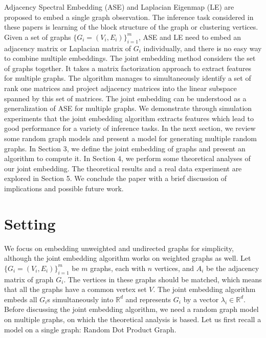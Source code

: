 \documentclass[10pt,journal,compsoc]{IEEEtran}
\begin{document}
\noindent Adjacency Spectral Embedding (ASE) and Laplacian Eigenmap (LE) are proposed to embed a single graph observation\cite{sussman2012consistent, belkin2003laplacian}. The inference task considered in these papers is learning of the block structure of the graph or clustering vertices. Given a set of graphs $\{G_i=(V_i,E_i)\} _{i=1}^{m}$, ASE and LE need to embed an adjacency matrix or Laplacian matrix of $G_i$ individually, and there is no easy way to combine multiple embeddings. The joint embedding method considers the set of graphs together. It takes a matrix factorization approach to extract features for multiple graphs. The algorithm manages to simultaneously identify a set of rank one matrices and project adjacency matrices into the linear subspace spanned by this set of matrices. The joint embedding can be understood as a generalization of ASE for multiple graphs. We demonstrate through simulation experiments that the joint embedding algorithm extracts features which lead to good performance for a variety of inference tasks. In the next section, we review some random graph models and present a model for generating multiple random graphs. In Section 3, we define the joint embedding of graphs and present an algorithm to compute it. In Section 4, we perform some theoretical analyses of our joint embedding. The theoretical results and a real data experiment are explored in Section 5. We conclude the paper with a brief discussion of implications and possible future work.

\section{Setting}
We focus on embedding unweighted and undirected graphs for simplicity, although the joint embedding algorithm works on weighted graphs as well. Let $\{G_i=(V_i,E_i)\} _{i=1}^{m}$ be $m$ graphs, each with $n$ vertices, and $A_i$ be the adjacency matrix of graph $G_i$. The vertices in these graphs should be matched, which means that all the graphs have a common vertex set $V$. The joint embedding algorithm embeds all $G_i$s simultaneously into $\mathbb{R}^d$ and represents $G_i$  by a vector $\lambda_i \in \mathbb{R}^d$. Before discussing the joint embedding algorithm, we need a random graph model on multiple graphs, on which the theoretical analysis is based. Let us first recall a model on a single graph: Random Dot Product Graph\cite{young2007random}. 
\end{document}
